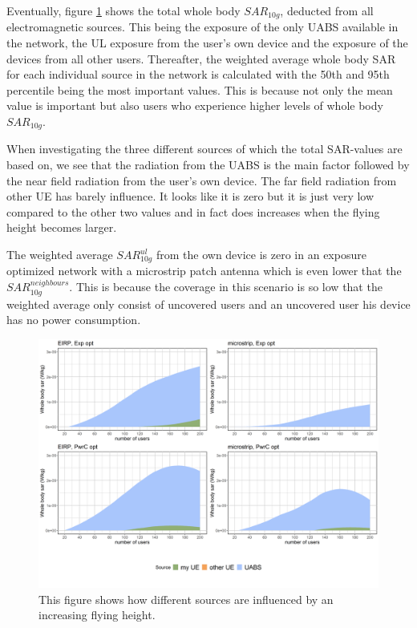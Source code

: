 Eventually, figure \ref{fig:s2shfourSourcesMatrix} shows the total whole body $SAR_{10g}$, deducted from all electromagnetic sources. This being the exposure 
of the only \gls{UABS} available in the network, 
 the \gls{UL} exposure from the user’s own device and the exposure of the devices from all other users. 
 Thereafter, the weighted average whole body \gls{SAR} for each individual source in the network is calculated with the 50th and 95th percentile 
 being the most important values. This is because not only the mean value is important but also users who experience higher 
 levels of whole body $SAR_{10g}$.

When investigating the three different sources of which the total \gls{SAR}-values are based on, we see 
that the radiation from the \gls{UABS} is the main factor followed by the near field radiation from the user's own device.
The far field radiation from other \gls{UE} has barely influence. 
It looks like it is zero but it is just very low compared to the other two values and in fact does increases when the flying height becomes larger.

The weighted average $SAR^{ul}_{10g}$ from the own device is zero in an exposure optimized network with a microstrip patch antenna which is even lower that the $SAR^{neighbours}_{10g}$.
This is because the coverage in this scenario is so low that the weighted average only consist of uncovered users and an uncovered user his device has no power consumption.
\begin{figure}[]
  \includegraphics[width=\textwidth]{../results/s2/fhFourSources.png}
  \caption{This figure shows how different sources are influenced by an increasing flying height.}
  \label{fig:s2shfourSourcesMatrix}
\end{figure}

